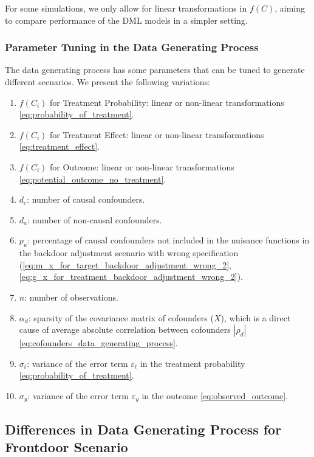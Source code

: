 \documentclass{article}
\numberwithin{equation}{section}
\begin{document}
For some simulations, we only allow for linear transformations in $f(C)$, aiming to compare performance of the DML models in a simpler setting.

\subsubsection{Parameter Tuning in the Data Generating Process}
\label{subsubsec:parameter_tuning_in_the_data_generating_process_backdoor}

The data generating process has some parameters that can be tuned to generate different scenarios. We present the following variations:

\begin{enumerate}[label=\roman*.]
    \item $f(C_i)$ for Treatment Probability: linear or non-linear transformations \eqref{eq:probability_of_treatment}.
    \item $f(C_i)$ for Treatment Effect: linear or non-linear transformations \eqref{eq:treatment_effect}.
    \item $f(C_i)$ for Outcome: linear or non-linear transformations \eqref{eq:potential_outcome_no_treatment}.
    \item $d_c$: number of causal confounders.
    \item $d_a$: number of non-causal confounders.
    \item $p_u$: percentage of causal confounders not included in the nuisance functions in the backdoor adjustment scenario with wrong specification (\ref{eq:m_x_for_target_backdoor_adjustment_wrong_2}, \ref{eq:g_x_for_treatment_backdoor_adjustment_wrong_2}).
    \item $n$: number of observations.
    \item $\alpha_d$: sparsity of the covariance matrix of cofounders ($X$), which is a direct cause of average absolute correlation between cofounders ${|\rho_d|}$ \eqref{eq:cofounders_data_generating_process}.
    \item $\sigma_t$: variance of the error term $\varepsilon_t$ in the treatment probability \eqref{eq:probability_of_treatment}.
    \item $\sigma_y$: variance of the error term $\varepsilon_y$ in the outcome \eqref{eq:observed_outcome}.
\end{enumerate}

\subsection{Differences in Data Generating Process for Frontdoor Scenario}
\label{subsec:differences_in_data_generating_process_for_frontdoor_scenario}
\end{document}

